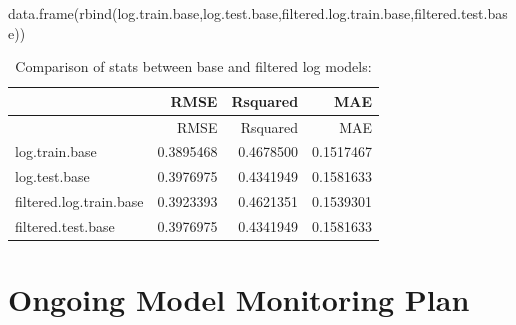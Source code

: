 \documentclass[
  letterpaper,
  DIV=11,
  numbers=noendperiod]{scrartcl}
\newenvironment{Shaded}{\begin{snugshade}}{\end{snugshade}}
\newcommand{\AttributeTok}[1]{\textcolor[rgb]{0.40,0.45,0.13}{#1}}
\newcommand{\CommentTok}[1]{\textcolor[rgb]{0.37,0.37,0.37}{#1}}
\newcommand{\DecValTok}[1]{\textcolor[rgb]{0.68,0.00,0.00}{#1}}
\newcommand{\FunctionTok}[1]{\textcolor[rgb]{0.28,0.35,0.67}{#1}}
\newcommand{\NormalTok}[1]{\textcolor[rgb]{0.00,0.23,0.31}{#1}}
\newcommand{\OtherTok}[1]{\textcolor[rgb]{0.00,0.23,0.31}{#1}}
\newcommand{\SpecialCharTok}[1]{\textcolor[rgb]{0.37,0.37,0.37}{#1}}
\newcommand{\StringTok}[1]{\textcolor[rgb]{0.13,0.47,0.30}{#1}}
\begin{document}
\begin{Shaded}
\end{Shaded}

\begin{Shaded}
\begin{Highlighting}[]
\FunctionTok{data.frame}\NormalTok{(}\FunctionTok{rbind}\NormalTok{(log.train.base,log.test.base,filtered.log.train.base,filtered.test.base))}
\end{Highlighting}
\end{Shaded}

\begin{longtable}[]{@{}lrrr@{}}
\caption{Comparison of stats between base and filtered log
models:}\tabularnewline
\toprule\noalign{}
& RMSE & Rsquared & MAE \\
\midrule\noalign{}
\endfirsthead
\toprule\noalign{}
& RMSE & Rsquared & MAE \\
\midrule\noalign{}
\endhead
\bottomrule\noalign{}
\endlastfoot
log.train.base & 0.3895468 & 0.4678500 & 0.1517467 \\
log.test.base & 0.3976975 & 0.4341949 & 0.1581633 \\
filtered.log.train.base & 0.3923393 & 0.4621351 & 0.1539301 \\
filtered.test.base & 0.3976975 & 0.4341949 & 0.1581633 \\
\end{longtable}

\section{Ongoing Model Monitoring
Plan}\label{ongoing-model-monitoring-plan}
\end{document}
